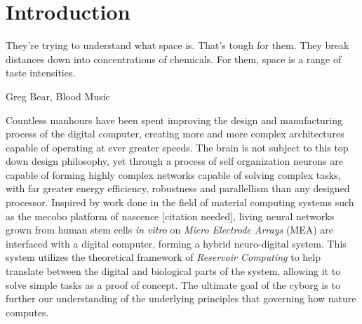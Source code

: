 \chapter{Introduction}
\epigraph{They're trying to understand what space is. That's tough for them.
They break distances down into concentrations of chemicals. For them, space is a
range of taste intensities.}{Greg Bear, Blood Music}
%
Countless manhours have been spent improving the design and manufacturing
process of the digital computer, creating more and more complex architectures
capable of operating at ever greater speeds.
%
The brain is not subject to this top down design philosophy, yet through a
process of self organization neurons are capable of forming highly complex
networks capable of solving complex tasks, with far greater energy efficiency,
robustness and parallellism than any designed processor.
%
Inspired by work done in the field of material computing systems such as the
mecobo platform of nascence [citation needed], living neural networks grown from
human stem cells \emph{in vitro} on \emph{Micro Electrode Arrays} (MEA) are interfaced
with a digital computer, forming a hybrid neuro-digital system.
%
This system utilizes the theoretical framework of \emph{Reservoir Computing} to
help translate between the digital and biological parts of the system, allowing
it to solve simple tasks as a proof of concept.
%
The ultimate goal of the cyborg is to further our understanding of the
underlying principles that governing how nature computes.

